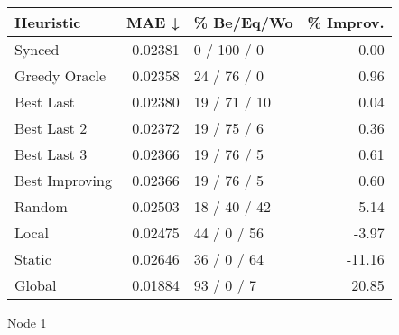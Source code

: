 \begin{tabular}{lrlr}
\toprule
\textbf{Heuristic} & \textbf{MAE ↓} & \textbf{\% Be/Eq/Wo} & \textbf{\% Improv.} \\
\midrule
            Synced &        0.02381 &          0 / 100 / 0 &                0.00 \\
     Greedy Oracle &        0.02358 &          24 / 76 / 0 &                0.96 \\
         Best Last &        0.02380 &         19 / 71 / 10 &                0.04 \\
       Best Last 2 &        0.02372 &          19 / 75 / 6 &                0.36 \\
       Best Last 3 &        0.02366 &          19 / 76 / 5 &                0.61 \\
    Best Improving &        0.02366 &          19 / 76 / 5 &                0.60 \\
            Random &        0.02503 &         18 / 40 / 42 &               -5.14 \\
             Local &        0.02475 &          44 / 0 / 56 &               -3.97 \\
            Static &        0.02646 &          36 / 0 / 64 &              -11.16 \\
            Global &        0.01884 &           93 / 0 / 7 &               20.85 \\
\bottomrule
\end{tabular}
\caption{Node 1}
\label{tab:iid_lr05_le1_bs4_1}
